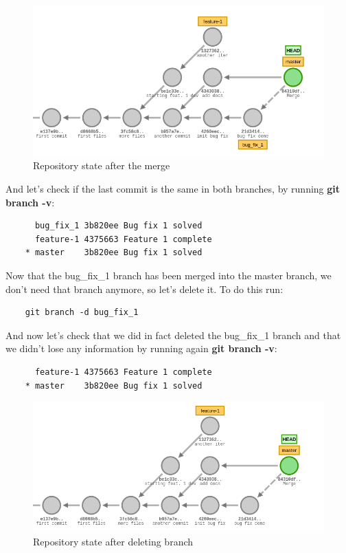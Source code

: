\documentclass{article}
\begin{document}
\begin{figure}[H]
\centerline{\includegraphics[scale=0.5]{repository_after_merge.png}}
\caption{Repository state after the merge}
\label{fig1}
\end{figure}

And let's check if the last commit is the same in both branches, by running \textbf{git branch -v}:

\begin{lstlisting}
	  bug_fix_1 3b820ee Bug fix 1 solved
	  feature-1 4375663 Feature 1 complete
	* master    3b820ee Bug fix 1 solved
\end{lstlisting}

Now that the bug\_fix\_1 branch has been merged into the master branch, we don't need that branch anymore, so let's delete it. To do this run:

\begin{lstlisting}
	git branch -d bug_fix_1
\end{lstlisting}

And now let's check that we did in fact deleted the bug\_fix\_1 branch and that we didn't lose any information by running again \textbf{git branch -v}:

\begin{lstlisting}
	  feature-1 4375663 Feature 1 complete
	* master    3b820ee Bug fix 1 solved
\end{lstlisting}

\begin{figure}[H]
\centerline{\includegraphics[scale=0.5]{repository_after_deleting_branch.png}}
\caption{Repository state after deleting branch}
\label{fig1}
\end{figure}
\end{document}
